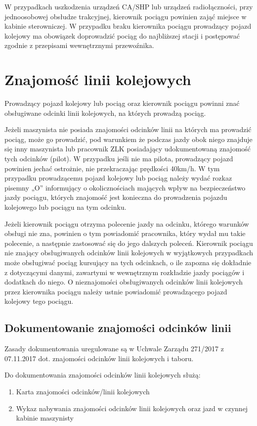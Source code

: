 W przypadkach uszkodzenia urządzeń CA/SHP lub urządzeń radiołączności, przy jednoosobowej obsłudze trakcyjnej, kierownik pociągu powinien zająć miejsce w kabinie sterowniczej. W przypadku braku kierownika pociągu prowadzący pojazd kolejowy ma obowiązek doprowadzić pociąg do najbliższej stacji i postępować zgodnie z przepisami wewnętrznymi przewoźnika. 

\section{Znajomość linii kolejowych}

Prowadzący pojazd kolejowy lub pociąg oraz kierownik pociągu powinni znać obsługiwane odcinki linii kolejowych, na których prowadzą pociąg.

Jeżeli maszynista nie posiada znajomości odcinków linii na których ma prowadzić pociąg, może go prowadzić, pod warunkiem że podczas jazdy obok niego znajduje się inny maszynista lub pracownik ZLK posiadający udokumentowaną znajomość tych
odcinków (pilot). W przypadku jeśli nie ma pilota, prowadzący pojazd powinien jechać ostrożnie, nie przekraczając prędkości 40km/h. W tym przypadku prowadzącemu pojazd kolejowy lub pociąg należy wydać rozkaz pisemny „O” informujący o okolicznościach mających wpływ na bezpieczeństwo jazdy pociągu, których znajomość jest konieczna do prowadzenia pojazdu kolejowego lub pociągu na tym odcinku.

Jeżeli kierownik pociągu otrzyma polecenie jazdy na odcinku, którego warunków obsługi nie zna, powinien o tym powiadomić pracownika, który wydał mu takie polecenie, a następnie zastosować się do jego dalszych poleceń. Kierownik pociągu nie znający obsługiwanych odcinków linii kolejowych w wyjątkowych przypadkach może obsługiwać pociąg kursujący na tych odcinkach, o ile zapozna się dokładnie z dotyczącymi danymi, zawartymi w wewnętrznym rozkładzie jazdy pociągów i dodatkach do niego. O nieznajomości obsługiwanych odcinków linii kolejowych przez kierownika pociągu należy ustnie powiadomić prowadzącego pojazd kolejowy tego pociągu.

\subsection{Dokumentowanie znajomości odcinków linii}

Zasady dokumentowania uregulowane są w Uchwale Zarządu 271/2017 z 07.11.2017 dot. znajomości odcinków linii kolejowych i taboru.

Do dokumentowania znajomości odcinków linii kolejowych służą:
\begin{enumerate}
	\item Karta znajomości odcinków/linii kolejowych
	\item Wykaz nabywania znajomości odcinków linii kolejowych oraz jazd w czynnej kabinie maszynisty
\end{enumerate}


